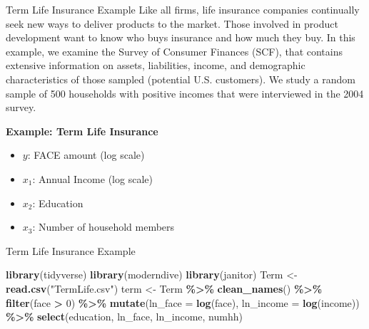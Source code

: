 \documentclass[
  ignorenonframetext,
]{beamer}
\newenvironment{Shaded}{\begin{snugshade}}{\end{snugshade}}
\newcommand{\AttributeTok}[1]{\textcolor[rgb]{0.13,0.29,0.53}{#1}}
\newcommand{\DecValTok}[1]{\textcolor[rgb]{0.00,0.00,0.81}{#1}}
\newcommand{\FunctionTok}[1]{\textcolor[rgb]{0.13,0.29,0.53}{\textbf{#1}}}
\newcommand{\NormalTok}[1]{#1}
\newcommand{\OtherTok}[1]{\textcolor[rgb]{0.56,0.35,0.01}{#1}}
\newcommand{\SpecialCharTok}[1]{\textcolor[rgb]{0.81,0.36,0.00}{\textbf{#1}}}
\newcommand{\StringTok}[1]{\textcolor[rgb]{0.31,0.60,0.02}{#1}}
\providecommand{\tightlist}{%
  \setlength{\itemsep}{0pt}\setlength{\parskip}{0pt}}
\begin{document}
\begin{frame}{Term Life Insurance Example}
\protect\hypertarget{term-life-insurance-example}{}
Like all firms, life insurance companies continually seek new ways to
deliver products to the market. Those involved in product development
want to know who buys insurance and how much they buy. In this example,
we examine the Survey of Consumer Finances (SCF), that contains
extensive information on assets, liabilities, income, and demographic
characteristics of those sampled (potential U.S. customers). We study a
random sample of 500 households with positive incomes that were
interviewed in the 2004 survey.

\textbf{Example: Term Life Insurance}

\begin{itemize}
\tightlist
\item
  \(y\): FACE amount (log scale)
\item
  \(x_1\): Annual Income (log scale)
\item
  \(x_2\): Education
\item
  \(x_3\): Number of household members
\end{itemize}
\end{frame}

\begin{frame}[fragile]{Term Life Insurance Example}
\protect\hypertarget{term-life-insurance-example-1}{}
\normalsize

\begin{Shaded}
\begin{Highlighting}[]
\FunctionTok{library}\NormalTok{(tidyverse)}
\FunctionTok{library}\NormalTok{(moderndive)}
\FunctionTok{library}\NormalTok{(janitor)}
\NormalTok{Term }\OtherTok{\textless{}{-}} \FunctionTok{read.csv}\NormalTok{(}\StringTok{"TermLife.csv"}\NormalTok{)}
\NormalTok{term }\OtherTok{\textless{}{-}}\NormalTok{ Term }\SpecialCharTok{\%\textgreater{}\%} 
  \FunctionTok{clean\_names}\NormalTok{() }\SpecialCharTok{\%\textgreater{}\%} 
  \FunctionTok{filter}\NormalTok{(face }\SpecialCharTok{\textgreater{}} \DecValTok{0}\NormalTok{) }\SpecialCharTok{\%\textgreater{}\%} 
  \FunctionTok{mutate}\NormalTok{(}\AttributeTok{ln\_face =} \FunctionTok{log}\NormalTok{(face), }\AttributeTok{ln\_income =} \FunctionTok{log}\NormalTok{(income)) }\SpecialCharTok{\%\textgreater{}\%} 
  \FunctionTok{select}\NormalTok{(education, ln\_face, ln\_income, numhh)}
\end{Highlighting}
\end{Shaded}

\normalsize
\end{frame}
\end{document}
